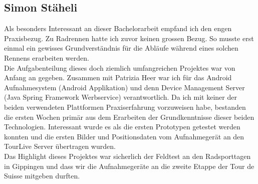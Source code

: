 \subsection{Simon Stäheli}
Als besonders Interessant an dieser Bachelorarbeit empfand ich den engen Praxisbezug. Zu Radrennen hatte ich zuvor keinen grossen Bezug. So musste erst einmal ein gewisses Grundverständnis für die Abläufe während eines solchen Rennens erarbeiten werden. 
\\

Die Aufgabenteilung dieses doch ziemlich umfangreichen Projektes war von Anfang an gegeben. Zusammen mit Patrizia Heer war ich für das Android Aufnahmesystem (Android Applikation) und denn Device Management Server (Java Spring Framework Werbservice) verantwortlich. Da ich mit keiner der beiden verwendeten Plattformen Praxiserfahrung vorzuweisen habe, bestanden die ersten Wochen primär aus dem Erarbeiten der  Grundkenntnisse dieser beiden Technologien. \citep{beginningandroid2009} Interessant wurde es als die ersten Prototypen getestet werden konnten und die ersten Bilder und Positionsdaten vom Aufnahmegerät an den TourLive Server übertragen wurden.
\\

Das Highlight dieses Projektes war sicherlich der Feldtest an den Radsporttagen in Gippingen und dass wir die Aufnahmegeräte an die zweite Etappe der Tour de Suisse mitgeben durften. 


